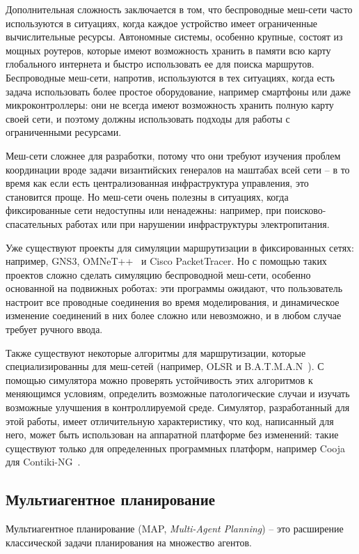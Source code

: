 \documentclass[%
]{report}
\begin{document}
Дополнительная сложность заключается в том, что
беспроводные меш-сети часто используются в ситуациях,
когда каждое устройство имеет ограниченные вычислительные ресурсы.
Автономные системы, особенно крупные,
состоят из мощных роутеров,
которые имеют возможность хранить в памяти всю карту глобального интернета
и быстро использовать ее для поиска маршрутов.
Беспроводные меш-сети, напротив, используются в тех ситуациях,
когда есть задача использовать более простое оборудование,
например смартфоны или даже микроконтроллеры:
они не всегда имеют возможность хранить полную карту своей сети,
и поэтому должны использовать подходы для работы с ограниченными ресурсами.

Меш-сети сложнее для разработки, потому что они требуют
изучения проблем координации вроде задачи византийских генералов на маштабах всей сети --
в то время как если есть централизованная инфраструктура управления, это становится проще.
Но меш-сети очень полезны в ситуациях, когда фиксированные сети недоступны или ненадежны:
например, при поисково-спасательных работах или при нарушении инфраструктуры электропитания.

Уже существуют проекты для симуляции маршрутизации в фиксированных сетях:
например, GNS3, OMNeT++~\cite{9181563} и Cisco PacketTracer.
Но с помощью таких проектов сложно сделать симуляцию беспроводной меш-сети,
особенно основанной на подвижных роботах:
эти программы ожидают, что пользователь настроит все проводные соединения
во время моделирования,
и динамическое изменение соединений в них более сложно или невозможно,
и в любом случае требует ручного ввода.

Также существуют некоторые алгоритмы для маршрутизации,
которые специализированны для меш-сетей
(например, OLSR и B.A.T.M.A.N~\cite{DBLP:journals/corr/abs-1901-02298}).
С помощью симулятора можно проверять устойчивость этих алгоритмов к меняющимся условиям,
определить возможные патологические случаи
и изучать возможные улучшения
в контроллируемой среде.
Симулятор, разработанный для этой работы,
имеет отличительную характеристику,
что код, написанный для него,
может быть использован на аппаратной платформе без изменений:
такие существуют только для определенных программных платформ, например Cooja для Contiki-NG~\cite{Contiki-NG}.

\subsection*{Мультиагентное планирование}

Мультиагентное планирование (MAP, \emph{Multi-Agent Planning}) --
это расширение классической задачи планирования
на множество агентов.
\end{document}
